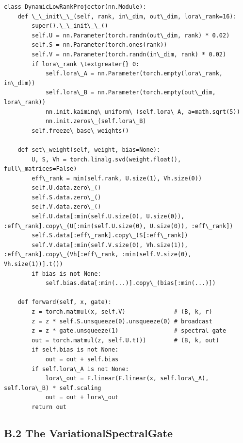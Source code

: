 \begin{lstlisting}
class DynamicLowRankProjector(nn.Module):
    def \_\_init\_\_(self, rank, in\_dim, out\_dim, lora\_rank=16):
        super().\_\_init\_\_()
        self.U = nn.Parameter(torch.randn(out\_dim, rank) * 0.02)
        self.S = nn.Parameter(torch.ones(rank))
        self.V = nn.Parameter(torch.randn(in\_dim, rank) * 0.02)
        if lora\_rank \textgreater{} 0:
            self.lora\_A = nn.Parameter(torch.empty(lora\_rank, in\_dim))
            self.lora\_B = nn.Parameter(torch.empty(out\_dim, lora\_rank))
            nn.init.kaiming\_uniform\_(self.lora\_A, a=math.sqrt(5))
            nn.init.zeros\_(self.lora\_B)
        self.freeze\_base\_weights()
    
    def set\_weight(self, weight, bias=None):
        U, S, Vh = torch.linalg.svd(weight.float(), full\_matrices=False)
        eff\_rank = min(self.rank, U.size(1), Vh.size(0))
        self.U.data.zero\_()
        self.S.data.zero\_()
        self.V.data.zero\_()
        self.U.data[:min(self.U.size(0), U.size(0)), :eff\_rank].copy\_(U[:min(self.U.size(0), U.size(0)), :eff\_rank])
        self.S.data[:eff\_rank].copy\_(S[:eff\_rank])
        self.V.data[:min(self.V.size(0), Vh.size(1)), :eff\_rank].copy\_(Vh[:eff\_rank, :min(self.V.size(0), Vh.size(1))].t())
        if bias is not None:
            self.bias.data[:min(...)].copy\_(bias[:min(...)])
    
    def forward(self, x, gate):
        z = torch.matmul(x, self.V)              # (B, k, r)
        z = z * self.S.unsqueeze(0).unsqueeze(0) # broadcast
        z = z * gate.unsqueeze(1)                # spectral gate
        out = torch.matmul(z, self.U.t())        # (B, k, out)
        if self.bias is not None:
            out = out + self.bias
        if self.lora\_A is not None:
            lora\_out = F.linear(F.linear(x, self.lora\_A), self.lora\_B) * self.scaling
            out = out + lora\_out
        return out
\end{lstlisting}

\subsection{B.2 The VariationalSpectralGate}

